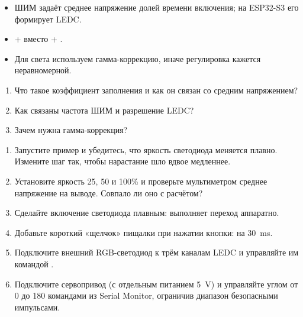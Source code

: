 \begin{summary}
\begin{itemize}[leftmargin=*]
  \item ШИМ задаёт среднее напряжение долей времени включения; на ESP32-S3 его формирует LEDC.
  \item {} +  вместо  + .
  \item Для света используем гамма-коррекцию, иначе регулировка кажется неравномерной.
\end{itemize}
\end{summary}

\begin{selfcheck}
\begin{enumerate}
  \item Что такое коэффициент заполнения и как он связан со средним напряжением?
  \item Как связаны частота ШИМ и разрешение LEDC?
  \item Зачем нужна гамма-коррекция?
\end{enumerate}
\end{selfcheck}

\begin{tasks}
\begin{enumerate}
\item {} Запустите пример и убедитесь, что яркость светодиода меняется плавно. Измените шаг так, чтобы нарастание шло вдвое медленнее.
\item {} Установите яркость 25, 50 и 100\% и проверьте мультиметром среднее напряжение на выводе. Совпало ли оно с расчётом?
\item {} Сделайте включение светодиода плавным:  выполняет переход аппаратно.
\item {} Добавьте короткий «щелчок» пищалки при нажатии кнопки:  на \SI{30}{ms}.
\item {} Подключите внешний RGB-светодиод к трём каналам LEDC и управляйте им командой .
\item {} Подключите сервопривод (с отдельным питанием \SI{5}{V}) и управляйте углом от 0 до 180\textdegree{} командами из Serial Monitor, ограничив диапазон безопасными импульсами.
\end{enumerate}
\end{tasks}
